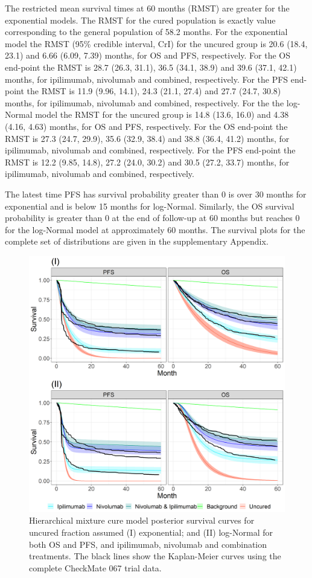 \documentclass[AMA,STIX1COL]{WileyNJD-v2}
\begin{document}
The restricted mean survival times at 60 months (RMST) are greater for the exponential models.
The RMST for the cured population is exactly value corresponding to the general population of 58.2 months.
For the exponential model the RMST (95\% credible interval, CrI) for the uncured group is 20.6 (18.4, 23.1) and 6.66 (6.09, 7.39) months, for OS and PFS, respectively. 
For the OS end-point the RMST is 28.7 (26.3, 31.1), 36.5 (34.1, 38.9) and 39.6 (37.1, 42.1) months, for ipilimumab, nivolumab and combined, respectively.
For the PFS end-point the RMST is 11.9 (9.96, 14.1), 24.3 (21.1, 27.4) and 27.7 (24.7, 30.8) months, for ipilimumab, nivolumab and combined, respectively.
For the the log-Normal model the RMST for the uncured group is 14.8 (13.6, 16.0) and 4.38 (4.16, 4.63) months, for OS and PFS, respectively. 
For the OS end-point the RMST is 27.3 (24.7, 29.9), 35.6 (32.9, 38.4) and 38.8 (36.4, 41.2) months, for ipilimumab, nivolumab and combined, respectively.
For the PFS end-point the RMST is 12.2 (9.85, 14.8), 27.2 (24.0, 30.2) and 30.5 (27.2, 33.7) months, for ipilimumab, nivolumab and combined, respectively.

The latest time PFS has survival probability greater than 0 is over 30 months for exponential and is below 15 months for log-Normal.
Similarly, the OS survival probability is greater than 0 at the end of follow-up at 60 months but reaches 0 for the log-Normal model at approximately 60 months.
The survival plots for the complete set of distributions are given in the supplementary Appendix.


\begin{figure}[!ht]
\centering
\includegraphics[width=0.7\linewidth]{plot_S_exp_lognormal_grid_cf_hier.png}
\caption{\label{fig:S_exp_lnorm_cf_hier} Hierarchical mixture cure model posterior survival curves for uncured fraction assumed (I) exponential; and (II) log-Normal for both OS and PFS, and ipilimumab, nivolumab and combination treatments. The black lines show the Kaplan-Meier curves using the complete CheckMate 067 trial data.}
\end{figure}
\end{document}
